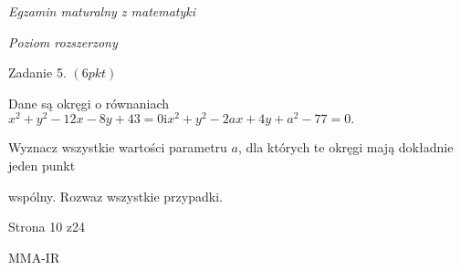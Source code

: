 \documentclass[a4paper,12pt]{article}
\begin{document}
{\it Egzamin maturalny z matematyki}

{\it Poziom rozszerzony}

Zadanie 5. $(6pkt)$

Dane są okręgi o równaniach $x^{2}+y^{2}-12x-8y+43=0 \mathrm{i} x^{2}+y^{2}-2ax+4y+a^{2}-77=0.$

Wyznacz wszystkie wartości parametru $a$, dla których te okręgi mają dokładnie jeden punkt

wspólny. Rozwaz wszystkie przypadki.

Strona 10 z24

MMA-IR
\end{document}
